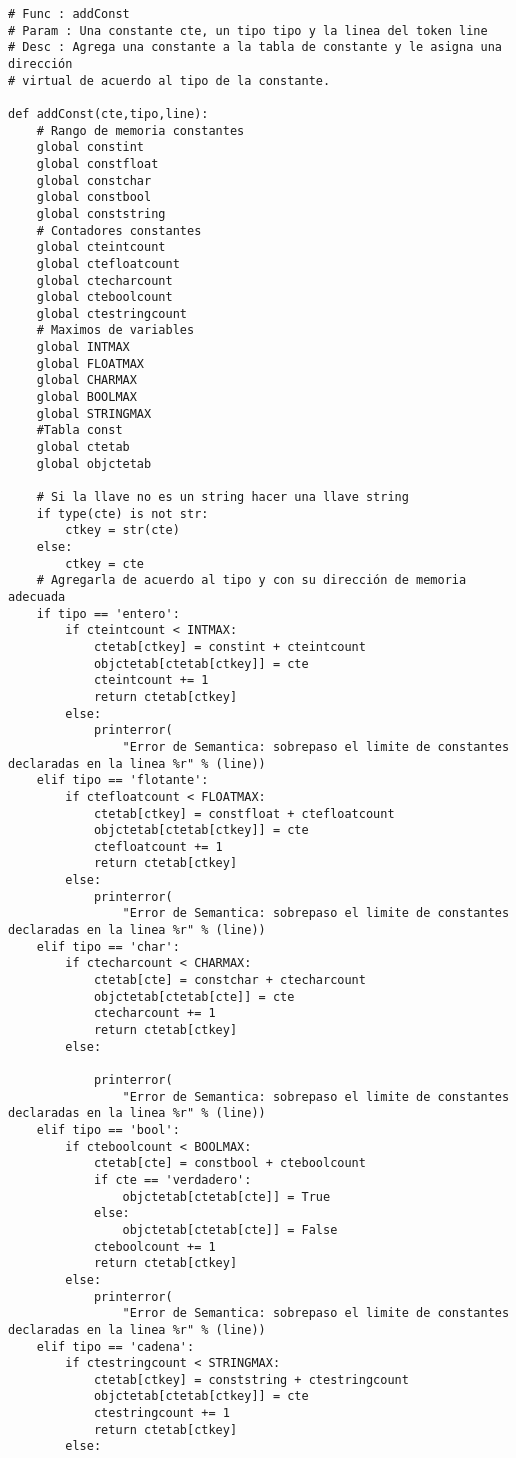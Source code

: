 \documentclass[krantz1,ChapterTOCs, spanish]{krantz}
\begin{document}
\begin{verbatim}
# Func : addConst
# Param : Una constante cte, un tipo tipo y la linea del token line
# Desc : Agrega una constante a la tabla de constante y le asigna una dirección 
# virtual de acuerdo al tipo de la constante.

def addConst(cte,tipo,line):
    # Rango de memoria constantes
    global constint
    global constfloat
    global constchar
    global constbool
    global conststring
    # Contadores constantes
    global cteintcount
    global ctefloatcount
    global ctecharcount
    global cteboolcount
    global ctestringcount
    # Maximos de variables
    global INTMAX
    global FLOATMAX
    global CHARMAX
    global BOOLMAX
    global STRINGMAX
    #Tabla const
    global ctetab
    global objctetab

    # Si la llave no es un string hacer una llave string
    if type(cte) is not str:
        ctkey = str(cte)
    else:
        ctkey = cte
    # Agregarla de acuerdo al tipo y con su dirección de memoria adecuada
    if tipo == 'entero':
        if cteintcount < INTMAX:
            ctetab[ctkey] = constint + cteintcount
            objctetab[ctetab[ctkey]] = cte
            cteintcount += 1
            return ctetab[ctkey]
        else:
            printerror(
                "Error de Semantica: sobrepaso el limite de constantes declaradas en la linea %r" % (line))
    elif tipo == 'flotante':
        if ctefloatcount < FLOATMAX:
            ctetab[ctkey] = constfloat + ctefloatcount
            objctetab[ctetab[ctkey]] = cte
            ctefloatcount += 1
            return ctetab[ctkey]
        else:
            printerror(
                "Error de Semantica: sobrepaso el limite de constantes declaradas en la linea %r" % (line))
    elif tipo == 'char':
        if ctecharcount < CHARMAX:
            ctetab[cte] = constchar + ctecharcount
            objctetab[ctetab[cte]] = cte
            ctecharcount += 1
            return ctetab[ctkey]
        else:

            printerror(
                "Error de Semantica: sobrepaso el limite de constantes declaradas en la linea %r" % (line))
    elif tipo == 'bool':
        if cteboolcount < BOOLMAX:
            ctetab[cte] = constbool + cteboolcount
            if cte == 'verdadero':
                objctetab[ctetab[cte]] = True
            else:
                objctetab[ctetab[cte]] = False
            cteboolcount += 1
            return ctetab[ctkey]
        else:
            printerror(
                "Error de Semantica: sobrepaso el limite de constantes declaradas en la linea %r" % (line))
    elif tipo == 'cadena':
        if ctestringcount < STRINGMAX:
            ctetab[ctkey] = conststring + ctestringcount
            objctetab[ctetab[ctkey]] = cte
            ctestringcount += 1
            return ctetab[ctkey]
        else:


\end{verbatim}
\end{document}

